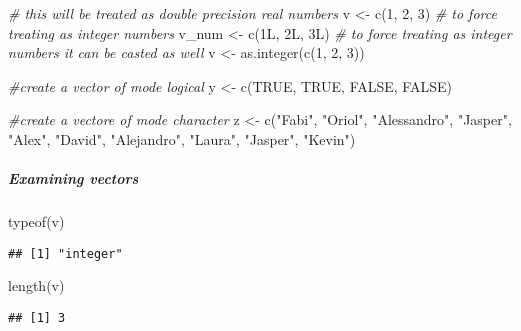 \documentclass[
]{article}
\newenvironment{Shaded}{\begin{snugshade}}{\end{snugshade}}
\newcommand{\CommentTok}[1]{\textcolor[rgb]{0.56,0.35,0.01}{\textit{#1}}}
\newcommand{\ConstantTok}[1]{\textcolor[rgb]{0.00,0.00,0.00}{#1}}
\newcommand{\DecValTok}[1]{\textcolor[rgb]{0.00,0.00,0.81}{#1}}
\newcommand{\FunctionTok}[1]{\textcolor[rgb]{0.00,0.00,0.00}{#1}}
\newcommand{\NormalTok}[1]{#1}
\newcommand{\OtherTok}[1]{\textcolor[rgb]{0.56,0.35,0.01}{#1}}
\newcommand{\StringTok}[1]{\textcolor[rgb]{0.31,0.60,0.02}{#1}}
\begin{document}
\begin{Shaded}
\begin{Highlighting}[]
\CommentTok{\# this will be treated as double precision real numbers}
\NormalTok{v }\OtherTok{\textless{}{-}} \FunctionTok{c}\NormalTok{(}\DecValTok{1}\NormalTok{, }\DecValTok{2}\NormalTok{, }\DecValTok{3}\NormalTok{)}
\CommentTok{\# to force treating as integer numbers}
\NormalTok{v\_num }\OtherTok{\textless{}{-}} \FunctionTok{c}\NormalTok{(1L, 2L, 3L)}
\CommentTok{\# to force treating as integer numbers it can be casted as well}
\NormalTok{v }\OtherTok{\textless{}{-}} \FunctionTok{as.integer}\NormalTok{(}\FunctionTok{c}\NormalTok{(}\DecValTok{1}\NormalTok{, }\DecValTok{2}\NormalTok{, }\DecValTok{3}\NormalTok{))}

\CommentTok{\#create a vector of mode logical}
\NormalTok{y }\OtherTok{\textless{}{-}} \FunctionTok{c}\NormalTok{(}\ConstantTok{TRUE}\NormalTok{, }\ConstantTok{TRUE}\NormalTok{, }\ConstantTok{FALSE}\NormalTok{, }\ConstantTok{FALSE}\NormalTok{)}

\CommentTok{\#create a vectore of mode character}
\NormalTok{z }\OtherTok{\textless{}{-}} \FunctionTok{c}\NormalTok{(}\StringTok{"Fabi"}\NormalTok{, }\StringTok{"Oriol"}\NormalTok{, }\StringTok{"Alessandro"}\NormalTok{, }\StringTok{"Jasper"}\NormalTok{, }\StringTok{"Alex"}\NormalTok{, }\StringTok{"David"}\NormalTok{, }\StringTok{"Alejandro"}\NormalTok{, }\StringTok{"Laura"}\NormalTok{, }\StringTok{"Jasper"}\NormalTok{, }\StringTok{"Kevin"}\NormalTok{)}
\end{Highlighting}
\end{Shaded}

\hypertarget{examining-vectors}{%
\subparagraph{Examining vectors}\label{examining-vectors}}

\begin{Shaded}
\begin{Highlighting}[]
\FunctionTok{typeof}\NormalTok{(v)}
\end{Highlighting}
\end{Shaded}

\begin{verbatim}
## [1] "integer"
\end{verbatim}

\begin{Shaded}
\begin{Highlighting}[]
\FunctionTok{length}\NormalTok{(v)}
\end{Highlighting}
\end{Shaded}

\begin{verbatim}
## [1] 3
\end{verbatim}
\end{document}
